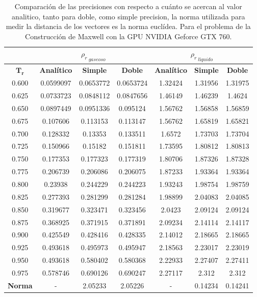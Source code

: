\begin{table}[h!]
\centering
	\begin{tabular}{|c|c|c|c|c|c|c|}
	\hline
	& \multicolumn{3}{c|}{${\rho_{r}}_{\>gaseoso}$}      & \multicolumn{3}{c|}{${\rho_{r}}_{\>líquido}$} \\ \hline
	$\mathbf{T_r}$    & \textbf{Analítico}      & \textbf{Simple}       & \textbf{Doble}     & \textbf{Analítico}      & \textbf{Simple}     & \textbf{Doble}   \\ \hline
	0.600 & 0.0599097 & 0.0653772 & 0.0653724 & 1.32424  & 1.31956 & 1.31975 \\ \hline
	0.625 & 0.0733723 & 0.0848112 & 0.0847656 & 1.46149  & 1.46239 & 1.4624  \\ \hline
	0.650 & 0.0897449 & 0.0951336 & 0.095124  & 1.56762  & 1.56858 & 1.56859 \\ \hline
	0.675 & 0.107606  & 0.113153  & 0.113147  & 1.56762  & 1.65819 & 1.65821 \\ \hline
	0.700 & 0.128332  & 0.13353   & 0.133511  & 1.6572   & 1.73703 & 1.73704 \\ \hline
	0.725 & 0.150966  & 0.15182   & 0.151811  & 1.73595  & 1.80812 & 1.80813 \\ \hline
	0.750 & 0.177353  & 0.177323  & 0.177319  & 1.80706  & 1.87326 & 1.87328 \\ \hline
	0.775 & 0.206739  & 0.206086  & 0.206075  & 1.87233  & 1.93364 & 1.93364 \\ \hline
	0.800 & 0.23938   & 0.244229  & 0.244223  & 1.93243  & 1.98754 & 1.98759 \\ \hline
	0.825 & 0.277393  & 0.281299  & 0.281284  & 1.98899  & 2.04083 & 2.04085 \\ \hline
	0.850 & 0.319677  & 0.323471  & 0.323456  & 2.0423   & 2.09124 & 2.09124 \\ \hline
	0.875 & 0.368925  & 0.371915  & 0.371891  & 2.09234  & 2.14114 & 2.14117 \\ \hline
	0.900 & 0.425549  & 0.428416  & 0.428335  & 2.14012  & 2.18665 & 2.18665 \\ \hline
	0.925 & 0.493618  & 0.495973  & 0.495947  & 2.18563  & 2.23017 & 2.23019 \\ \hline
	0.950 & 0.493618  & 0.580402  & 0.580368  & 2.22933  & 2.27407 & 2.27411 \\ \hline
	0.975 & 0.578746  & 0.690126  & 0.690247  & 2.27117  & 2.312   & 2.312   \\ \hline
	\textbf{Norma} & -         & 2.05233   & 2.05226   & -        & 0.14234 & 0.14241 \\ \hline
\end{tabular}%
    \caption{Comparación de las precisiones con respecto a cuánto se acercan al valor analitico, tanto para doble, como simple precision, la norma utilizada para medir la distancia de los vectores es la norma  euclídea. Para el problema de la Construcción de Maxwell con la GPU NVIDIA Geforce GTX 760.}
    \label{tab:comp_MxC_precisiones_10}
    \end{table}

